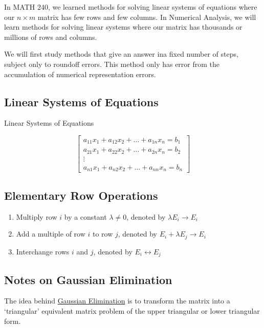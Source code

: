 \documentclass[12pt]{article}
\begin{document}
In MATH 240, we learned methods for solving linear systems of equations where
our $n \times m$ matrix has few rows and few columns. In Numerical Analysis, we
will learn methods for solving linear systems where our matrix has thousands or
millions of rows and columns.

We will first study methods that give an answer ina  fixed number of steps, 
subject only to roundoff errors. This method only has error from the accumulation
of numerical representation errors.

\subsection{Linear Systems of Equations}

Linear Systems of Equations

\begin{equation*}
  \begin{bmatrix}
    a_{11} x_1 + a_{12} x_2 + \dots + a_{1n} x_n = b_1 \\
    a_{21} x_1 + a_{22} x_2 + \dots + a_{2n} x_n = b_2 \\
    \vdots \\
    a_{n1} x_1 + a_{n2} x_2 + \dots + a_{nn} x_n = b_n
  \end{bmatrix}
\end{equation*}

\subsection{Elementary Row Operations}

\begin{enumerate}
\item Multiply row $i$ by a constant $\lambda \ne 0$, denoted by 
  $\lambda E_i \to E_i$
\item Add a multiple of row $i$ to row $j$, denoted by $E_i + \lambda E_j \to E_i$
\item Interchange rows $i$ and $j$, denoted by $E_i \leftrightarrow E_j$
\end{enumerate}

\subsection{Notes on Gaussian Elimination}

The idea behind \uline{Gaussian Elimination} is to transform the matrix into
a \enquote*{triangular} equivalent matrix problem of the upper triangular
or lower triangular form.
\end{document}
